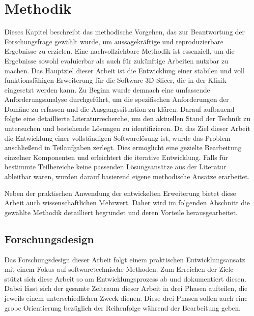 \chapter{Methodik}
\label{chap:methodik} Dieses Kapitel beschreibt das methodische Vorgehen, das
zur Beantwortung der Forschungsfrage gewählt wurde, um aussagekräftige und reproduzierbare
Ergebnisse zu erzielen. Eine nachvollziehbare Methodik ist essenziell, um die Ergebnisse
sowohl evaluierbar als auch für zukünftige Arbeiten nutzbar zu machen. Das
Hauptziel dieser Arbeit ist die Entwicklung einer stabilen und voll
funktionsfähigen Erweiterung für die Software 3D Slicer, die in der Klinik eingesetzt
werden kann. Zu Beginn wurde demnach eine umfassende Anforderungsanalyse
durchgeführt, um die spezifischen Anforderungen der Domäne zu erfassen und die Ausgangssituation
zu klären. Darauf aufbauend folgte eine detaillierte Literaturrecherche, um den aktuellen
Stand der Technik zu untersuchen und bestehende Lösungen zu identifizieren. Da
das Ziel dieser Arbeit die Entwicklung einer vollständigen Softwarelösung ist, wurde
das Problem anschließend in Teilaufgaben zerlegt. Dies ermöglicht eine gezielte
Bearbeitung einzelner Komponenten und erleichtert die iterative Entwicklung. Falls
für bestimmte Teilbereiche keine passenden Lösungsansätze aus der Literatur ableitbar
waren, wurden darauf basierend eigene methodische Ansätze erarbeitet.

Neben der praktischen Anwendung der entwickelten Erweiterung bietet diese Arbeit
auch wissenschaftlichen Mehrwert. Daher wird im folgenden Abschnitt die gewählte
Methodik detailliert begründet und deren Vorteile herausgearbeitet.

\section{Forschungsdesign}
Das Forschungsdesign dieser Arbeit folgt einem praktischen Entwicklungsansatz mit
einem Fokus auf softwaretechnische Methoden. Zum Erreichen der Ziele stützt sich
diese Arbeit so am Entwicklungsprozess ab und dokumentiert diesen. Dabei lässt sich
der gesamte Zeitraum dieser Arbeit in drei Phasen aufteilen, die jeweils einem
unterschiedlichen Zweck dienen. Diese drei Phasen sollen auch eine grobe Orientierung
bezüglich der Reihenfolge während der Bearbeitung geben.

\pagebreak

